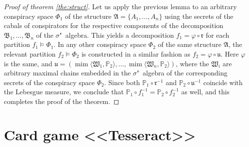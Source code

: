 	\begin{proof}[Proof of theorem \ref{the:struct}]
	Let us apply the previous lemma to an arbitrary conspiracy space $\Phi_1$ of the structure $\mathfrak{A} = \{A_1, \ldots, A_n\}$ using the secrets of the cabals of conspirators for the respective components of the decomposition $\mathfrak{B}_1, \ldots, \mathfrak{B}_n$ of the $\sigma$"~algebra. This yields a decomposition $f_1 = \varphi \circ \mathfrak{r}$ for each partition $f_1 \models \Phi_1$. In any other conspiracy space $\Phi_2$ of the same structure $\mathfrak{A}$, the relevant partition $f_2 \models \Phi_2$ is constructed in a similar fashion as $f_2 = \varphi \circ \mathfrak{u}$. Here $\varphi$ is the same, and $\mathfrak{u} = (\operatorname{mim}\langle\mathfrak{W}_1, \mathbb{P}_2\rangle, \ldots, \operatorname{mim}\langle\mathfrak{W}_n, \mathbb{P}_2\rangle)$, where the $\mathfrak{W}_i$ are arbitrary maximal chains embedded in the $\sigma$"~algebra of the corresponding secrets of the conspiracy space $\Phi_2$. Since both $\mathbb{P}_1 \circ \mathfrak{r}^{-1}$ and $\mathbb{P}_2 \circ \mathfrak{u}^{-1}$ coincide with the Lebesgue measure, we conclude that $\mathbb{P}_1 \circ f_1^{-1} = \mathbb{P}_2 \circ f_2^{-1}$ as well, and this completes the proof of the theorem. %
\end{proof}

\chapter{Card game <<Tesseract>>}\label{app:D}

